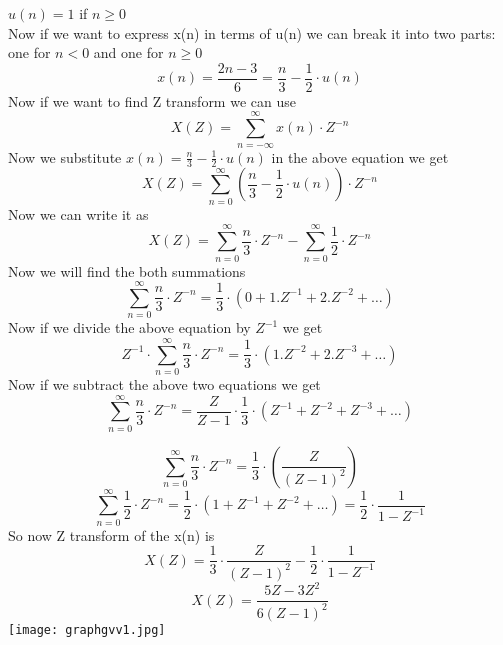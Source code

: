 \documentclass[journal,12pt,twocolumn]{IEEEtran}
\theoremstyle{remark}
\begin{document}
$u(n)=1 $ if $n \ge 0 $\\
Now if we want to express x(n) in terms of u(n) we can break it into two parts: one for $n < 0 $ and one for $ n \ge 0$  
$$ x(n) = \frac{2n-3}{6} = \frac{n}{3} - \frac{1}{2} \cdot u(n) $$
Now if we want to find Z transform we can use
$$ X(Z) = \sum_{n = -\infty}^{\infty} x(n) \cdot Z^{-n}$$
Now we substitute
$x(n) = \frac{n}{3} - \frac{1}{2} \cdot u(n)$ in the above equation we get
$$ X(Z) = \sum_{n = 0}^{\infty} (\frac{n}{3} - \frac{1}{2} \cdot u(n) )\cdot Z^{-n} $$
Now we can write it as
$$ X(Z) = \sum_{n=0}^{\infty} \frac{n}{3} \cdot Z^{-n} - \sum_{n=0}^{\infty} \frac{1}{2} \cdot Z^{-n}$$
Now we will find the both summations
$$ \sum_{n=0}^{\infty} \frac{n}{3} \cdot Z^{-n} = \frac{1}{3} \cdot (0 + 1.Z^{-1} + 2.Z^{-2} + \ldots)$$
Now if we divide the above equation by $Z^{-1}$ we get
$$ Z^{-1} \cdot \sum_{n=0}^{\infty} \frac{n}{3} \cdot Z^{-n} =\frac{1}{3} \cdot (1.Z^{-2} + 2.Z^{-3} + \ldots )$$
Now if we subtract the above two equations we get
$$ \sum_{n=0}^{\infty} \frac{n}{3} \cdot Z^{-n} = \frac{Z}{Z-1} \cdot \frac{1}{3} \cdot (Z^{-1} + Z^{-2} + Z^{-3} + \ldots)$$

$$ \sum_{n=0}^{\infty} \frac{n}{3} \cdot Z^{-n} = \frac{1}{3} \cdot \left(\frac{Z}{(Z-1)^{2}}\right)$$
$$ \sum_{n=0}^{\infty} \frac{1}{2} \cdot Z^{-n} = \frac{1}{2} \cdot (1+Z^{-1} + Z^{-2} + \ldots) = \frac{1}{2} \cdot \frac{1}{1- Z^{-1}}$$
So now Z transform of the x(n) is
$$ X(Z) = \frac{1}{3} \cdot \frac{Z}{(Z-1)^{2}} - \frac{1}{2} \cdot \frac{1}{1-Z^{-1}}$$
$$X(Z) = {\frac{5Z-3 Z^{2}}{6(Z-1)^{2}}}$$
\newpage
\texttt{[image: graphgvv1.jpg]}
\end{document}
